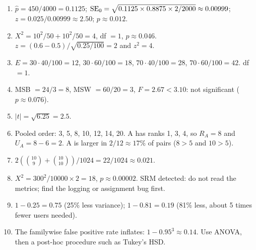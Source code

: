 \begin{enumerate}
  \item $\hat p = 450/4000 = 0.1125$;
  $\operatorname{SE}_0 = \sqrt{0.1125 \times 0.8875 \times 2/2000} \approx 0.00999$;
  $z = 0.025/0.00999 \approx 2.50$; $p \approx 0.012$.
  \item $X^2 = 10^2/50 + 10^2/50 = 4$, df $= 1$, $p \approx 0.046$.
  $z = (0.6 - 0.5)/\sqrt{0.25/100} = 2$ and $z^2 = 4$.
  \item $E = 30\cdot40/100 = 12$, $30\cdot60/100 = 18$, $70\cdot40/100 = 28$,
  $70\cdot60/100 = 42$. df $= 1$.
  \item MSB $= 24/3 = 8$, MSW $= 60/20 = 3$, $F = 2.67 < 3.10$: not
  significant ($p \approx 0.076$).
  \item $|t| = \sqrt{6.25} = 2.5$.
  \item Pooled order: 3, 5, 8, 10, 12, 14, 20. A has ranks 1, 3, 4, so
  $R_A = 8$ and $U_A = 8 - 6 = 2$. A is larger in $2/12 \approx 17\%$ of pairs
  ($8>5$ and $10>5$).
  \item $2(\binom{10}{9} + \binom{10}{10})/1024 = 22/1024 \approx 0.021$.
  \item $X^2 = 300^2/10000 \times 2 = 18$, $p \approx 0.00002$. SRM detected:
  do not read the metrics; find the logging or assignment bug first.
  \item $1 - 0.25 = 0.75$ (25\% less variance); $1 - 0.81 = 0.19$ (81\% less,
  about 5 times fewer users needed).
  \item The familywise false positive rate inflates: $1 - 0.95^3 \approx 0.14$.
  Use ANOVA, then a post-hoc procedure such as Tukey's HSD.
\end{enumerate}
